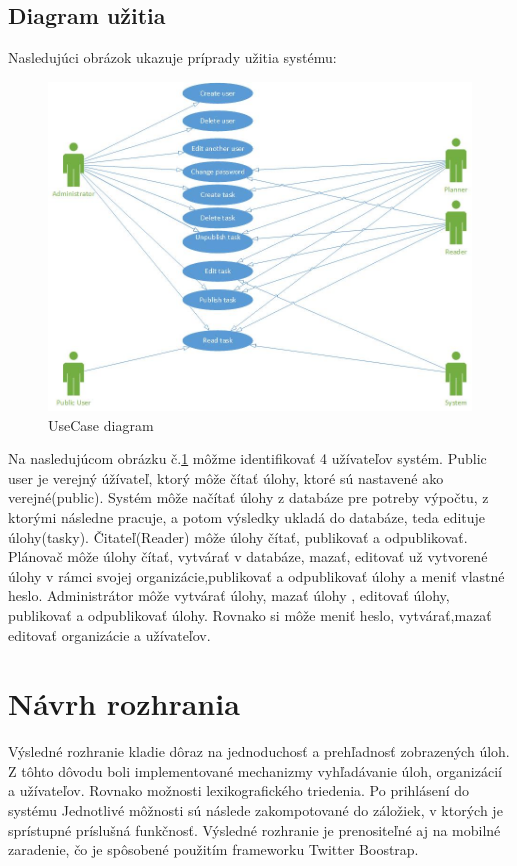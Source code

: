 \subsection{Diagram užitia}
Nasledujúci obrázok ukazuje príprady užitia systému:
\begin{figure}[htb]

\begin{center}

\includegraphics[scale=0.5]{UseCase.jpg} 
\caption{UseCase diagram}
\label{use}

\end{center}

\end{figure}
Na nasledujúcom obrázku č.\ref{use} môžme identifikovať 4 užívateľov systém. Public user je verejný úžívateľ, ktorý môže čítať úlohy, ktoré sú nastavené ako verejné(public). Systém môže načítať úlohy z databáze pre potreby výpočtu, z ktorými následne pracuje, a potom výsledky ukladá do databáze, teda edituje úlohy(tasky). Čitateľ(Reader) môže úlohy čítať, publikovať a odpublikovať. Plánovač môže úlohy čítať, vytvárať v databáze, mazať, editovať už vytvorené úlohy v rámci svojej organizácie,publikovať a odpublikovať úlohy a meniť vlastné heslo. Administrátor môže vytvárať úlohy, mazať úlohy , editovať úlohy, publikovať a odpublikovať úlohy. Rovnako si môže meniť heslo, vytvárať,mazať editovať organizácie a užívateľov.




\section{Návrh rozhrania}
Výsledné rozhranie kladie dôraz na jednoduchosť a prehľadnosť zobrazených úloh. Z tôhto dôvodu boli implementované mechanizmy vyhľadávanie úloh, organizácií a užívateľov. Rovnako možnosti lexikografického triedenia. Po prihlásení do systému Jednotlivé môžnosti sú následe zakompotované do záložiek, v ktorých je sprístupné príslušná funkčnosť. Výsledné rozhranie je prenositeľné aj na mobilné zaradenie, čo je spôsobené použitím frameworku Twitter Boostrap.



